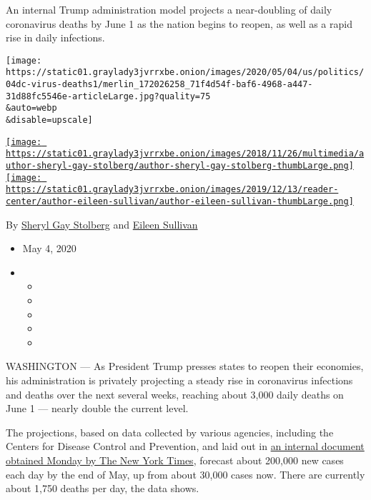 An internal Trump administration model projects a near-doubling of daily
coronavirus deaths by June 1 as the nation begins to reopen, as well as
a rapid rise in daily infections.

\texttt{[image: https://static01.graylady3jvrrxbe.onion/images/2020/05/04/us/politics/04dc-virus-deaths1/merlin\_172026258\_71f4d54f-baf6-4968-a447-31d88fc5546e-articleLarge.jpg?quality=75\\\&auto=webp\\\&disable=upscale]}

\href{https://www.nytimes3xbfgragh.onion/by/sheryl-gay-stolberg}{\texttt{[image: https://static01.graylady3jvrrxbe.onion/images/2018/11/26/multimedia/author-sheryl-gay-stolberg/author-sheryl-gay-stolberg-thumbLarge.png]}}\href{https://www.nytimes3xbfgragh.onion/by/eileen-sullivan}{\texttt{[image: https://static01.graylady3jvrrxbe.onion/images/2019/12/13/reader-center/author-eileen-sullivan/author-eileen-sullivan-thumbLarge.png]}}

By
\href{https://www.nytimes3xbfgragh.onion/by/sheryl-gay-stolberg}{Sheryl
Gay Stolberg} and
\href{https://www.nytimes3xbfgragh.onion/by/eileen-sullivan}{Eileen
Sullivan}

\begin{itemize}
\item
  May 4, 2020
\item
  \begin{itemize}
  \item
  \item
  \item
  \item
  \item
  \end{itemize}
\end{itemize}

WASHINGTON --- As President Trump presses states to reopen their
economies, his administration is privately projecting a steady rise in
coronavirus infections and deaths over the next several weeks, reaching
about 3,000 daily deaths on June 1 --- nearly double the current level.

The projections, based on data collected by various agencies, including
the Centers for Disease Control and Prevention, and laid out in
\href{https://int.graylady3jvrrxbe.onion/data/documenthelper/6926-mayhhsbriefing/af7319f4a55fd0ce5dc9/optimized/full.pdf\#page=1}{an
internal document obtained Monday by The New York Times}, forecast about
200,000 new cases each day by the end of May, up from about 30,000 cases
now. There are currently about 1,750 deaths per day, the data shows.

